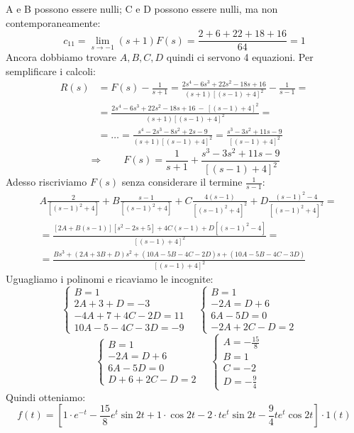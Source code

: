 \begin{mdframed}[style=Exercise]
\begin{Exercise}[title={Poli reali semplici, poli complessi multipli}, difficulty=3]
			A e B possono essere nulli; C e D possono essere nulli, ma non contemporaneamente:
			\[
				c_{11} = \lim\limits_{s \rightarrow -1} (s+1)F(s) = \frac{2+6+22+18+16}{64} = 1
			\]
			Ancora dobbiamo trovare $ A, B, C, D $ quindi ci servono 4 equazioni. Per semplificare i calcoli:
			\begin{align*}
				R(s) &= F(s) - \frac{1}{s+1} = \frac{2s^4-6s^3+22s^2-18s+16}{(s+1)[(s-1)+4]^2} - \frac{1}{s-1} =
				\\
				&= \frac{2s^4-6s^3+22s^2-18s+16\ -\ [(s-1)+4]^2}{(s+1)[(s-1)+4]^2} =
				\\
				&= \dots = \frac{s^4-2s^3-8s^2+2s-9}{(s+1)[(s-1)+4]^2} = \frac{s^3-3s^2+11s-9}{[(s-1)+4]^2}
			\end{align*}
			\[
				\Rightarrow \qquad F(s) = \frac{1}{s+1} + \frac{s^3-3s^2+11s-9}{[(s-1)+4]^2}
			\]
			Adesso riscriviamo $ F(s) $ senza considerare il termine $ \frac{1}{s-1} $:
			\begin{align*}
				&A \frac{2}{[(s-1)^2+4]} + B \frac{s-1}{[(s-1)^2+4]} + C \frac{4(s-1)}{[(s-1)^2+4]^2} + D \frac{(s-1)^2-4}{[(s-1)^2+4]^2} =
				\\
				&= \frac{[2A+B(s-1)][s^2-2s+5] + 4C(s-1) + D[(s-1)^2-4]}{[(s-1)+4]^2} =
				\\
				&= \frac{Bs^3 + (2A+3B+D)s^2 + (10A-5B-4C-2D)s + (10A-5B-4C-3D)}{[(s-1)+4]^2}
			\end{align*}
			Uguagliamo i polinomi e ricaviamo le incognite:
			\[ 
				\begin{cases}
					B = 1\\
					2A + 3 + D = -3\\
					-4A + 7 + 4C - 2D = 11\\
					10A - 5 - 4C - 3D = -9
				\end{cases} \quad
				\begin{cases}
					B=1\\
					-2A=D+6\\
					6A-5D=0\\
					-2A+2C-D=2
				\end{cases} \quad
			\]
			\[
				\begin{cases}
					B=1\\
					-2A=D+6\\
					6A-5D=0\\
					D+6+2C-D=2
				\end{cases} \quad
				\begin{cases}
					A=-\frac{15}{8}\\
					B=1\\
					C=-2\\
					D=-\frac{9}{4}
				\end{cases} \quad
			\]
			Quindi otteniamo:
			\[
				f(t) = [1 \cdot e^{-t} -\frac{15}{8} e^t \sin2t + 1 \cdot \cos2t -2 \cdot t e^t \sin2t -\frac{9}{4} t e^t \cos2t] \cdot 1(t)
			\]
		\end{Exercise}
	\end{mdframed}